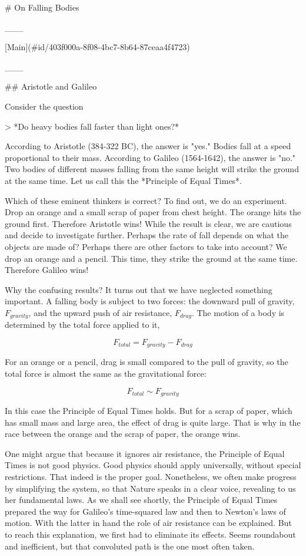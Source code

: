 # On Falling Bodies

___

[Main](#id/403f000a-8f08-4bc7-8b64-87ceaa4f4723)

___

## Aristotle and Galileo

Consider the question

> *Do heavy bodies fall faster than light ones?*  

According to Aristotle (384-322 BC), the answer is "yes." Bodies fall at a speed proportional to their mass. According to Galileo (1564-1642), the answer is "no." Two bodies of different masses falling from the same height will strike the ground at the same time.  Let us call this the *Principle of Equal Times*.

Which of these eminent thinkers is correct?  To find out, we do an experiment. Drop an orange and a small scrap of paper from chest height. The orange hits the ground first.  Therefore Aristotle wins!  While the result is clear, we are cautious and decide to investigate further.  Perhaps the rate of fall depends on what the objects are made of? Perhaps there are other factors to take into account? We drop an orange and a pencil. This time, they strike the ground at the same time. Therefore Galileo wins!

Why the confusing results?  It turns out  that we have neglected something important.  A falling body is subject to two forces: the downward pull of gravity, $F_{gravity}$, and the upward push of air resistance, $F_{drag}$. The motion of a body is determined by the total force applied to it,

$$
F_{total} = F_{gravity} - F_{drag}
$$

For an orange or a pencil, drag is small compared to the pull of gravity, so the total force  is almost the same as the gravitational force:

$$
F_{total} \sim F_{gravity}
$$

In this case the Principle of Equal Times holds.  But for a scrap of paper, which has small mass and large area, the effect of drag is quite large.  That is why in the race between the orange and the scrap of paper, the orange wins.


One might argue that because it ignores air resistance, the Principle of Equal Times is not good physics.  Good physics should apply universally, without special restrictions.  That indeed is the proper goal.  Nonetheless, we often make progress by simplifying the system, so that Nature speaks in a clear voice, revealing to us her fundamental laws.  As we shall see shortly, the Principle of Equal Times prepared the way for Galileo's time-squared law and then to Newton's laws of motion.  With the latter in hand the role of air resistance can be explained.  But to reach this explanation, we first had to eliminate its effects.  Seems roundabout and inefficient, but that convoluted path is the one most often taken.






